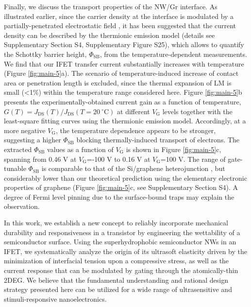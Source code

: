 \documentclass[journal=nalefd,manuscript=letter,email=true,hyperref=true,keywords=true]{achemso}
\begin{document}
Finally, we discuss the transport properties of the NW/Gr
interface. As illustrated earlier, since the carrier density at the
interface is modulated by a partially-penetrated electrostatic field
\cite{Tian_2016,Shih2015Partially}, it has been suggested that the
current density can be described by the thermionic emission model
\cite{Sze2006Mosfets} (details see Supplementary Section S4,
Supplementary Figure S25), which allows to quantify the Schottky
barrier height, \(\Phi_{\mathrm{SB}}\), from the temperature-dependent
measurements. We find that our IFET transfer current substantially
increases with temperature (Figure \ref{fig:main-5}a). The scenario of
temperature-induced increase of contact area or penetration length is
excluded, since the thermal expansion of LM is small (\textless{}1\%)
within the temperature range considered here. Figure  \ref{fig:main-5}b
presents the experimentally-obtained current gain as a function of
temperature, \(G(T)=J_{\mathrm{DS}}(T)/J_{\mathrm{DS}}(T=20\ ^{\circ}
  \mathrm{C})\) at different \(V_{\mathrm{G}}\) levels together with the
least-square fitting curves using the thermionic emission
model. Accordingly, at a more negative \(V_{\mathrm{G}}\), the
temperature dependence appears to be stronger, suggesting a higher
\(\Phi_{\mathrm{SB}}\) blocking thermally-induced transport of
electrons. The extracted \(\Phi_{\mathrm{SB}}\) values as a function
of \(V_{\mathrm{G}}\) is shown in Figure \ref{fig:main-5}c, spanning from
0.46 V at \(V_{\mathrm{G}}\)=-100 V to 0.16 V at
\(V_{\mathrm{G}}\)=100 V.  The range of gate-tunable
\(\Phi_{\mathrm{SB}}\) is comparable to that of the Si/graphene
heterojunction \cite{Yang2012Barristor}, but considerably lower than
our theoretical prediction using the elementary electronic
properties of graphene (Figure \ref{fig:main-5}c, see Supplementary
Section S4). A degree of Fermi level pinning due to the
surface-bound traps \cite{Meric_2008} may explain the
observation.



In this work, we establish a new concept to reliably incorporate
mechanical durability and responsiveness in a transistor by
engineering the wettability of a semiconductor surface. Using the
superhydrophobic semiconductor NWs in an IFET, we systematically
analyze the origin of its ultrasoft elasticity driven by the
minimization of interfacial tension upon a compressive stress, as well
as the current response that can be modulated by gating through the
atomically-thin 2DEG. We believe that the fundamental understanding
and rational design strategy presented here can be utilized for a wide
range of ultrasensitive and stimuli-responsive nanoelectronics.
\end{document}
